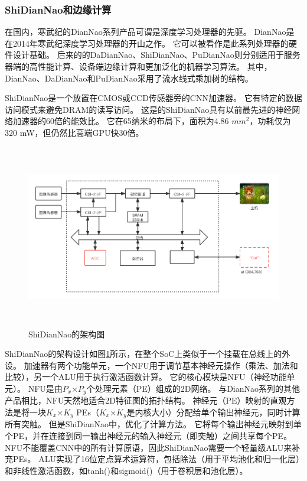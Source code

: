 \subsubsection{ShiDianNao和边缘计算}
在国内，寒武纪的DianNao系列产品可谓是深度学习处理器的先驱。
DianNao是在2014年寒武纪深度学习处理器的开山之作。
它可以被看作是此系列处理器的硬件设计基础。
后来的的DaDianNao、ShiDianNao、PuDianNao则分别适用于服务器端的高性能计算、设备端边缘计算和更加泛化的机器学习算法。
其中，DianNao、DaDianNao和PuDianNao采用了流水线式乘加树的结构。  %


ShiDianNao是一个放置在CMOS或CCD传感器旁的CNN加速器。
它有特定的数据访问模式来避免DRAM的读写访问。
这是的ShiDianNao具有以前最先进的神经网络加速器的60倍的能效比。
它在65纳米的布局下，面积为4.86 $mm^2$，功耗仅为320 mW，但仍然比高端GPU快30倍。

\begin{figure}[htbp]
    \centering
    \includegraphics[width=15cm,height=8cm]{figures/ShiDianNao_arch.png}
    \caption{ShiDianNao的架构图}
    \label{fig:shidiannao_arch}
\end{figure}
ShiDianNao的架构设计如图\ref{fig:shidiannao_arch}所示，在整个SoC上类似于一个挂载在总线上的外设。
加速器有两个功能单元，一个NFU用于调节基本神经元操作（乘法、加法和比较），另一个ALU用于执行激活函数计算。
它的核心模块是NFU（神经功能单元）。
NFU是由$P_x$×$P_y$个处理元素（PE）组成的2D网络。
与DianNao系列的其他产品相比，NFU天然地适合2D特征图的拓扑结构。  
神经元（PE）映射的直观方法是将一块$K_x$×$K_y$ PEs（$K_x$×$K_y$是内核大小）分配给单个输出神经元，同时计算所有突触。
但是ShiDianNao中，优化了计算方法。
它将每个输出神经元映射到单个PE，并在连接到同一输出神经元的输入神经元（即突触）之间共享每个PE。  
NFU不能覆盖CNN中的所有计算原语，因此ShiDianNao需要一个轻量级ALU来补充PEs。
ALU实现了16位定点算术运算符，包括除法（用于平均池化和归一化层）和非线性激活函数，如tanh()和sigmoid()（用于卷积层和池化层）。



